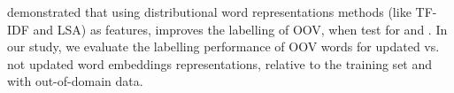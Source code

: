  demonstrated that using distributional word representations methods (like TF-IDF and LSA) as features, improves the labelling of OOV, when test for \pos and \chunking. In our study, we evaluate the labelling performance of OOV words for updated vs. not updated word embeddings representations, relative to the training set and with out-of-domain data.








